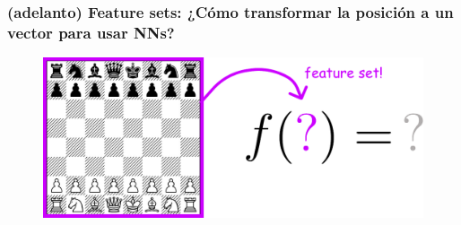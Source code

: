 \begin{frame}
\frametitle{(adelanto) Feature sets: ¿Cómo transformar la posición a un vector para usar NNs?}
\begin{figure}
\centering
\includegraphics[width=1.0\linewidth]{../assets/slides/fs_motiv2.pdf}
\end{figure}
\end{frame}


